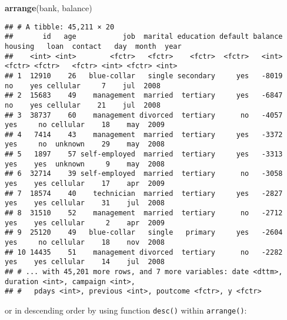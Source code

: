 \documentclass[]{book}
\newenvironment{Shaded}{\begin{snugshade}}{\end{snugshade}}
\newcommand{\KeywordTok}[1]{\textcolor[rgb]{0.13,0.29,0.53}{\textbf{{#1}}}}
\newcommand{\StringTok}[1]{\textcolor[rgb]{0.31,0.60,0.02}{{#1}}}
\newcommand{\NormalTok}[1]{{#1}}
\begin{document}
\begin{Shaded}
\begin{Highlighting}[]
\KeywordTok{arrange}\NormalTok{(bank, balance)}
\end{Highlighting}
\end{Shaded}

\begin{verbatim}
## # A tibble: 45,211 × 20
##       id   age           job  marital education default balance housing   loan  contact   day  month  year
##    <int> <int>        <fctr>   <fctr>    <fctr>  <fctr>   <int>  <fctr> <fctr>   <fctr> <int> <fctr> <int>
## 1  12910    26   blue-collar   single secondary     yes   -8019      no    yes cellular     7    jul  2008
## 2  15683    49    management  married  tertiary     yes   -6847      no    yes cellular    21    jul  2008
## 3  38737    60    management divorced  tertiary      no   -4057     yes     no cellular    18    may  2009
## 4   7414    43    management  married  tertiary     yes   -3372     yes     no  unknown    29    may  2008
## 5   1897    57 self-employed  married  tertiary     yes   -3313     yes    yes  unknown     9    may  2008
## 6  32714    39 self-employed  married  tertiary      no   -3058     yes    yes cellular    17    apr  2009
## 7  18574    40    technician  married  tertiary     yes   -2827     yes    yes cellular    31    jul  2008
## 8  31510    52    management  married  tertiary      no   -2712     yes    yes cellular     2    apr  2009
## 9  25120    49   blue-collar   single   primary     yes   -2604     yes     no cellular    18    nov  2008
## 10 14435    51    management divorced  tertiary      no   -2282     yes    yes cellular    14    jul  2008
## # ... with 45,201 more rows, and 7 more variables: date <dttm>, duration <int>, campaign <int>,
## #   pdays <int>, previous <int>, poutcome <fctr>, y <fctr>
\end{verbatim}

or in descending order by using function \texttt{desc()} within
\texttt{arrange()}:

\begin{Shaded}
\end{Shaded}
\end{document}

